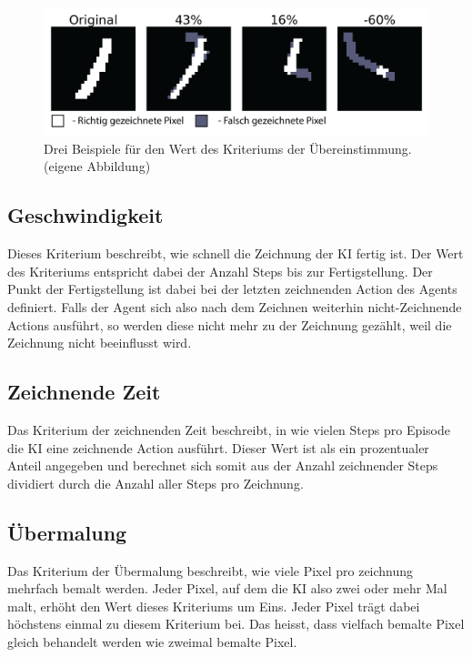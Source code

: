 \begin{figure}[!ht]
 \centering
 \includegraphics[width=\textwidth]{images/methode/ubereinstimm.png}
 \caption{Drei Beispiele für den Wert des Kriteriums der Übereinstimmung. (eigene Abbildung)}\label{fig:ubereinstimmung}
\end{figure}
 
\subsection{Geschwindigkeit}\label{sub:m_eval_speed} Dieses Kriterium
beschreibt, wie schnell die Zeichnung der KI fertig ist. Der Wert des Kriteriums
entspricht dabei der Anzahl Steps bis zur Fertigstellung. Der Punkt der
Fertigstellung ist dabei bei der letzten zeichnenden Action des Agents
definiert. Falls der Agent sich also nach dem Zeichnen weiterhin
nicht-Zeichnende Actions ausführt, so werden diese nicht mehr zu der Zeichnung
gezählt, weil die Zeichnung nicht beeinflusst wird.

\subsection{Zeichnende Zeit}\label{sub:m_eval_zeichnend} Das Kriterium der
zeichnenden Zeit beschreibt, in wie vielen Steps pro Episode die KI eine
zeichnende Action ausführt. Dieser Wert ist als ein prozentualer Anteil
angegeben und berechnet sich somit aus der Anzahl zeichnender Steps dividiert
durch die Anzahl aller Steps pro Zeichnung.

\subsection{Übermalung}\label{sub:m_eval_uebermalung} Das Kriterium der
Übermalung beschreibt, wie viele Pixel pro zeichnung mehrfach bemalt werden.
Jeder Pixel, auf dem die KI also zwei oder mehr Mal malt, erhöht den Wert dieses
Kriteriums um Eins. Jeder Pixel trägt dabei höchstens einmal zu diesem Kriterium
bei. Das heisst, dass vielfach bemalte Pixel gleich behandelt werden wie
zweimal bemalte Pixel. 

